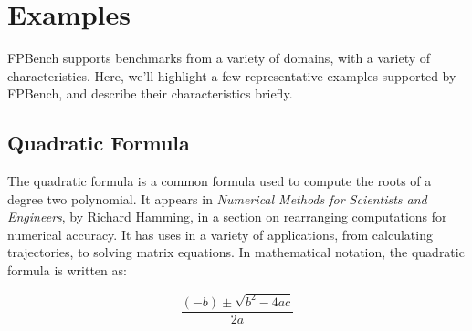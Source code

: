 \documentclass[main.tex]{subfiles}
\begin{document}
\section{Examples}

FPBench supports benchmarks from a variety of domains, with a variety
of characteristics. Here, we'll highlight a few representative
examples supported by FPBench, and describe their characteristics
briefly.

\subsection{Quadratic Formula}

The quadratic formula is a common formula used to compute the roots of
a degree two polynomial. It appears in \textit{Numerical Methods for
  Scientists and Engineers}, by Richard Hamming, in a section on
rearranging computations for numerical accuracy. It has uses in a
variety of applications, from calculating trajectories, to solving
matrix equations. In mathematical notation, the quadratic formula is
written as:

\begin{equation}
  \frac{(- b) \pm \sqrt{b^2 - 4ac}}{2a}
\end{equation}
\end{document}
